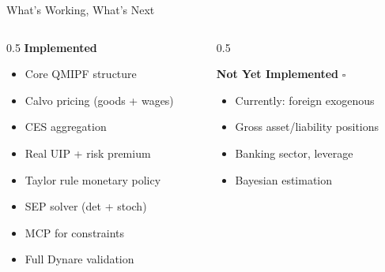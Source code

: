 \documentclass[aspectratio=169,12pt]{beamer}
\begin{document}
\begin{frame}{What's Working, What's Next}

\begin{columns}[T]
\begin{column}{0.5\textwidth}
\textbf{Implemented} \textcolor{green!60!black}{\checkmark}
\begin{itemize}
  \footnotesize
\item[\textcolor{green!60!black}{\checkmark}] Core QMIPF structure
\item[\textcolor{green!60!black}{\checkmark}] Calvo pricing (goods + wages)
\item[\textcolor{green!60!black}{\checkmark}] CES aggregation
\item[\textcolor{green!60!black}{\checkmark}] Real UIP + risk premium
\item[\textcolor{green!60!black}{\checkmark}] Taylor rule monetary policy
\item[\textcolor{green!60!black}{\checkmark}] SEP solver (det + stoch)
\item[\textcolor{green!60!black}{\checkmark}] MCP for constraints
\item[\textcolor{green!60!black}{\checkmark}] Full Dynare validation
\end{itemize}
\end{column}

\begin{column}{0.5\textwidth}
   \footnotesize

\textbf{Not Yet Implemented} $\square$
\begin{itemize}
\item Currently: foreign exogenous
\item Gross asset/liability positions
\item Banking sector, leverage
\item Bayesian estimation
\end{itemize}
\end{column}
\end{columns}


\end{frame}
\end{document}
